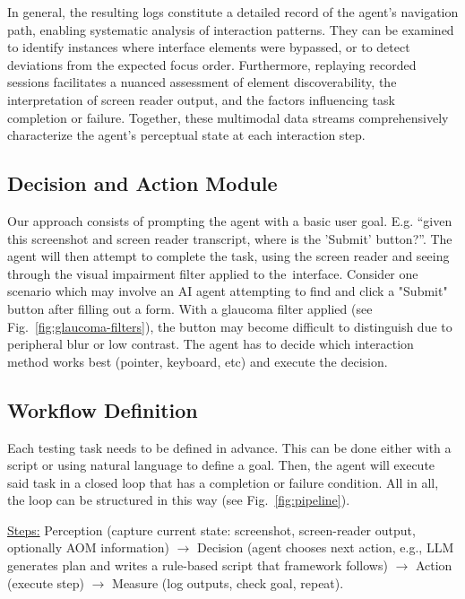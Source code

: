 In general, the resulting logs constitute a detailed record of the agent's navigation path, enabling systematic analysis of interaction patterns. They can be examined to identify instances where interface elements were bypassed, or to detect deviations from the expected focus order. Furthermore, replaying recorded sessions facilitates a nuanced assessment of element discoverability, the interpretation of screen reader output, and the factors influencing task completion or failure. Together, these multimodal data streams comprehensively characterize the agent's perceptual state at each interaction step. 


\subsection{Decision and Action Module}


Our approach consists of prompting the agent with a basic user goal. E.g. “given this screenshot and screen reader transcript, where is the 'Submit' button?”. The agent will then attempt to complete the task, using the screen reader and seeing through the visual impairment filter applied to the~interface.
Consider one scenario which may involve an \ac{AI} agent attempting to find and click a "Submit" button after filling out a form. With a glaucoma filter applied (see Fig.~\ref{fig:glaucoma-filters}), the button may become difficult to distinguish due to peripheral blur or low contrast. The agent has to decide which interaction method works best (pointer, keyboard, etc) and execute the decision.

\subsection{Workflow Definition}

Each testing task needs to be defined in advance. This can be done either with a script or using natural language to define a goal. Then, the agent will execute said task in a closed loop that has a completion or failure condition. All in all, the loop can be structured in this way (see Fig.~\ref{fig:pipeline}).

\underline{Steps:} Perception (capture current state: screenshot, screen-reader output, optionally \ac{AOM} information) $\rightarrow$ Decision (agent chooses next action, e.g., LLM generates plan and writes a rule-based script that framework follows) $\rightarrow$ Action (execute step) $\rightarrow$ Measure (log outputs, check goal, repeat).


